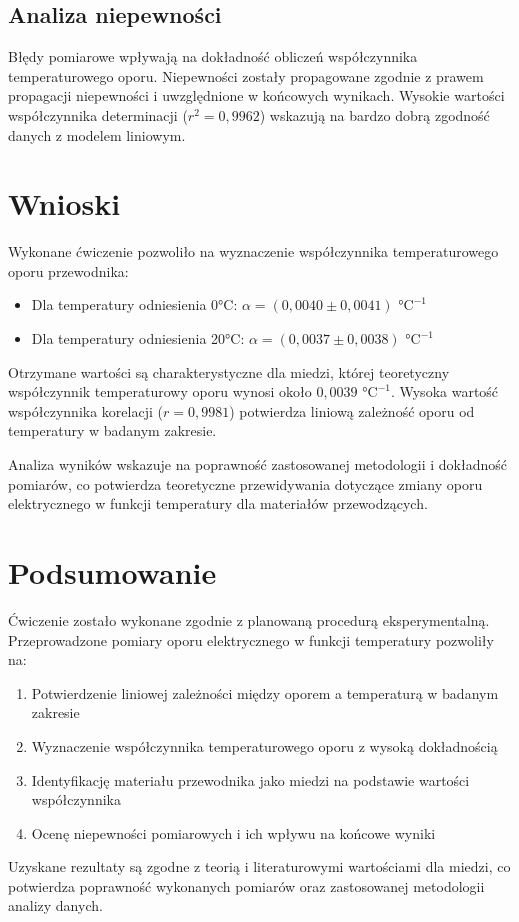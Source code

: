 \documentclass[11pt]{article}
\begin{document}
\subsection*{Analiza niepewności}
Błędy pomiarowe wpływają na dokładność obliczeń współczynnika temperaturowego oporu. Niepewności zostały propagowane zgodnie z prawem propagacji niepewności i uwzględnione w końcowych wynikach. Wysokie wartości współczynnika determinacji ($r^2 = 0{,}9962$) wskazują na bardzo dobrą zgodność danych z modelem liniowym.
\section*{Wnioski}

Wykonane ćwiczenie pozwoliło na wyznaczenie współczynnika temperaturowego oporu przewodnika:
\begin{itemize}
    \item Dla temperatury odniesienia 0°C: $\alpha = (0{,}0040 \pm 0{,}0041) \text{ °C}^{-1}$
    \item Dla temperatury odniesienia 20°C: $\alpha = (0{,}0037 \pm 0{,}0038) \text{ °C}^{-1}$
\end{itemize}

Otrzymane wartości są charakterystyczne dla miedzi, której teoretyczny współczynnik temperaturowy oporu wynosi około $0{,}0039 \text{ °C}^{-1}$. Wysoka wartość współczynnika korelacji ($r = 0{,}9981$) potwierdza liniową zależność oporu od temperatury w badanym zakresie.

Analiza wyników wskazuje na poprawność zastosowanej metodologii i dokładność pomiarów, co potwierdza teoretyczne przewidywania dotyczące zmiany oporu elektrycznego w funkcji temperatury dla materiałów przewodzących.
\section*{Podsumowanie}

Ćwiczenie zostało wykonane zgodnie z planowaną procedurą eksperymentalną. Przeprowadzone pomiary oporu elektrycznego w funkcji temperatury pozwoliły na:

\begin{enumerate}
    \item Potwierdzenie liniowej zależności między oporem a temperaturą w badanym zakresie
    \item Wyznaczenie współczynnika temperaturowego oporu z wysoką dokładnością
    \item Identyfikację materiału przewodnika jako miedzi na podstawie wartości współczynnika
    \item Ocenę niepewności pomiarowych i ich wpływu na końcowe wyniki
\end{enumerate}

Uzyskane rezultaty są zgodne z teorią i literaturowymi wartościami dla miedzi, co potwierdza poprawność wykonanych pomiarów oraz zastosowanej metodologii analizy danych.
\end{document}
